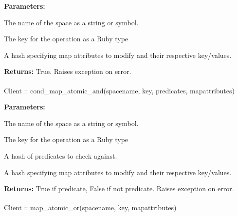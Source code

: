 \noindent\textbf{Parameters:}
\begin{description}[labelindent=\widthof{{\code{mapattributes}}},leftmargin=*,noitemsep,nolistsep,align=right]
\item[\code{spacename}] The name of the space as a string or symbol.
\item[\code{key}] The key for the operation as a Ruby type
\item[\code{mapattributes}] A hash specifying map attributes to modify and their respective key/values.
\end{description}

\noindent\textbf{Returns:}
True.  Raises exception on error.

\paragraph{}
\label{api:ruby:cond_map_atomic_and}
\begin{ccode}
Client :: cond_map_atomic_and(spacename, key, predicates, mapattributes)
\end{ccode}
\funcdesc 

\noindent\textbf{Parameters:}
\begin{description}[labelindent=\widthof{{\code{mapattributes}}},leftmargin=*,noitemsep,nolistsep,align=right]
\item[\code{spacename}] The name of the space as a string or symbol.
\item[\code{key}] The key for the operation as a Ruby type
\item[\code{predicates}] A hash of predicates to check against.
\item[\code{mapattributes}] A hash specifying map attributes to modify and their respective key/values.
\end{description}

\noindent\textbf{Returns:}
True if predicate, False if not predicate.  Raises exception on error.

\paragraph{}
\label{api:ruby:map_atomic_or}
\begin{ccode}
Client :: map_atomic_or(spacename, key, mapattributes)
\end{ccode}
\funcdesc 

